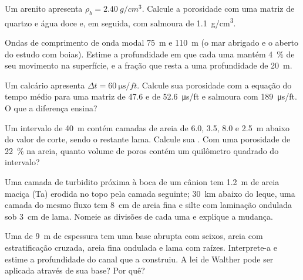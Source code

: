 \begin{exercise}[$\star$]\label{exo:b3:facies-models:3}
Um arenito apresenta $\rho_b = \qty{2.40}{g/cm^3}$. Calcule a porosidade com uma
matriz de quartzo e água doce e, em seguida, com salmoura de \qty{1.1}{g/cm^3}.
\end{exercise}

\begin{exercise}[$\star$]\label{exo:b3:facies-models:4}
Ondas de comprimento de onda modal \qty{75}{m} e \qty{110}{m} (o mar abrigado e
o aberto do estudo com boias). Estime a profundidade em que cada uma mantém
\qty{4}{\percent} de seu movimento na superfície, e a fração que resta a uma profundidade de
\qty{20}{m}.
\end{exercise}

\begin{exercise}[$\star\star$]\label{exo:b3:facies-models:5}
Um calcário apresenta $\Delta t = \qty{60}{\micro\second/ft}$. Calcule sua
porosidade com a equação do tempo médio para uma matriz de 47.6 e de
\qty{52.6}{\micro\second/ft} e salmoura com \qty{189}{\micro\second/ft}. O que
a diferença ensina?
\end{exercise}

\begin{exercise}[$\star\star$]\label{exo:b3:facies-models:6}
Um intervalo de \qty{40}{m} contém camadas de areia de 6.0, 3.5, 8.0 e \qty{2.5}{m}
abaixo do valor de corte, sendo o restante lama. Calcule sua . Com uma
porosidade de \qty{22}{\percent} na areia, quanto volume de poros contém um
quilômetro quadrado do intervalo?
\end{exercise}

\begin{exercise}[$\star\star$]\label{exo:b3:facies-models:7}
Uma camada de turbidito próxima à boca de um cânion tem \qty{1.2}{m} de areia maciça
(Ta) erodida no topo pela camada seguinte; \qty{30}{km} abaixo do leque, uma camada do
mesmo fluxo tem \qty{8}{cm} de areia fina e silte com laminação ondulada sob
\qty{3}{cm} de lama. Nomeie as divisões de cada uma e explique a mudança.
\end{exercise}

\begin{exercise}[$\star\star$]\label{exo:b3:facies-models:8}
Uma  de \qty{9}{m} de espessura tem uma base abrupta com seixos,
areia com estratificação cruzada, areia fina ondulada e lama com raízes. Interprete-a e
estime a profundidade do canal que a construiu. A lei de Walther pode ser aplicada através de
sua base? Por quê?
\end{exercise}

